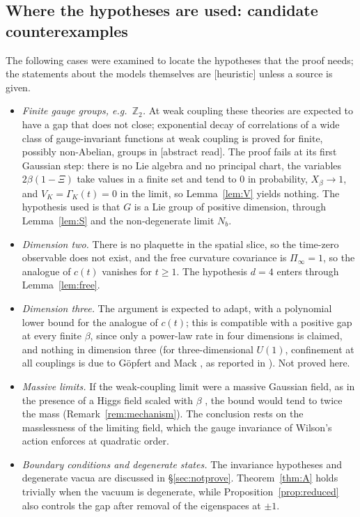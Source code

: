 \documentclass[11pt,a4paper]{article}
\theoremstyle{plain}
\theoremstyle{definition}
\theoremstyle{remark}
\numberwithin{equation}{section}
\newcommand{\Z}{\mathbb{Z}}
\newcommand{\st}[1]{\textsf{[#1]}}
\begin{document}
\subsection{Where the hypotheses are used: candidate counterexamples}
The following cases were examined to locate the hypotheses that the proof needs; the statements about the models themselves are
\st{heuristic} unless a source is given.
\begin{itemize}
\item \emph{Finite gauge groups, e.g.\ $\Z_2$.} At weak coupling these theories are expected to have a gap that does not close; exponential
decay of correlations of a wide class of gauge-invariant functions at weak coupling is proved for finite, possibly non-Abelian, groups in
\cite{AC25} \st{abstract read}. The proof fails at its first Gaussian step: there is no Lie algebra and no principal chart, the variables
$2\beta(1-\Xi)$ take values in a finite set and tend to $0$ in probability, $X_\beta\to1$, and $V_K=\Gamma_K(t)=0$ in the limit, so
Lemma~\ref{lem:V} yields nothing. The hypothesis used is that $G$ is a Lie group of positive dimension, through Lemma~\ref{lem:S} and the
non-degenerate limit $N_b$.
\item \emph{Dimension two.} There is no plaquette in the spatial slice, so the time-zero observable does not exist, and the free curvature
covariance is $\Pi_\infty=1$, so the analogue of $c(t)$ vanishes for $t\ge1$. The hypothesis $d=4$ enters through Lemma~\ref{lem:free}.
\item \emph{Dimension three.} The argument is expected to adapt, with a polynomial lower bound for the analogue of $c(t)$; this is
compatible with a positive gap at every finite $\beta$, since only a power-law rate in four dimensions is claimed, and nothing in dimension three (for three-dimensional $U(1)$, confinement at all couplings
is due to G\"opfert and Mack \cite{GM82}, as reported in \cite[p.~8]{Cha18}). Not proved here.
\item \emph{Massive limits.} If the weak-coupling limit were a massive Gaussian field, as in the presence of a Higgs field scaled with
$\beta$ \cite{Cha24,RYZ26}, the bound would tend to twice the mass (Remark~\ref{rem:mechanism}). The conclusion rests on the
masslessness of the limiting field, which the gauge invariance of Wilson's action enforces at quadratic order.
\item \emph{Boundary conditions and degenerate states.} The invariance hypotheses and degenerate vacua are discussed in
\S\ref{sec:notprove}. Theorem~\ref{thm:A} holds trivially when the vacuum is degenerate, while Proposition~\ref{prop:reduced} also
controls the gap after removal of the eigenspaces at $\pm1$.
\end{itemize}
\end{document}
